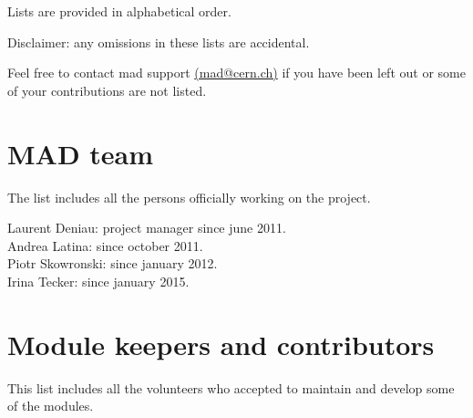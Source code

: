 


Lists are provided in alphabetical order.

Disclaimer: any omissions in these lists are accidental. 

Feel free to contact mad support
\href{mailto:mad.support@cern.ch}{(mad@cern.ch)} 
if you have been left out or some of your contributions are not listed. 

\section{MAD team}

The list includes all the persons officially working on the \madx project.

Laurent Deniau: project manager since june 2011.\\
Andrea Latina: since october 2011.\\
Piotr Skowronski: since january 2012.\\
Irina Tecker: since january 2015.\\


\section{Module keepers and contributors}

This list includes all the volunteers who accepted to maintain and
develop some of the \madx modules.

